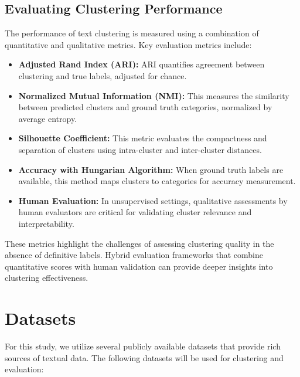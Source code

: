 \documentclass[11pt]{article}
\begin{document}
\subsection{Evaluating Clustering Performance}
The performance of text clustering is measured using a combination of quantitative and qualitative metrics. Key evaluation metrics include:
\begin{itemize}
    \item \textbf{Adjusted Rand Index (ARI):} ARI quantifies agreement between clustering and true labels, adjusted for chance.
    \item \textbf{Normalized Mutual Information (NMI):} This measures the similarity between predicted clusters and ground truth categories, normalized by average entropy.
    \item \textbf{Silhouette Coefficient:} This metric evaluates the compactness and separation of clusters using intra-cluster and inter-cluster distances.
    \item \textbf{Accuracy with Hungarian Algorithm:} When ground truth labels are available, this method maps clusters to categories for accuracy measurement.
    \item \textbf{Human Evaluation:} In unsupervised settings, qualitative assessments by human evaluators are critical for validating cluster relevance and interpretability.
\end{itemize}

These metrics highlight the challenges of assessing clustering quality in the absence of definitive labels. Hybrid evaluation frameworks that combine quantitative scores with human validation can provide deeper insights into clustering effectiveness.

\section{Datasets}
For this study, we utilize several publicly available datasets that provide rich sources of textual data. The following datasets will be used for clustering and evaluation:
\end{document}
